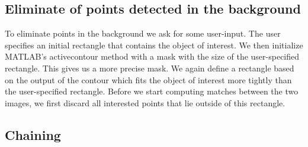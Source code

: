 \documentclass[12pt]{amsart}
\begin{document}
\subsection{Eliminate of points detected in the background}
\label{background}
To eliminate points in the background we ask for some user-input. The user specifies an initial rectangle that contains the object of interest. We then initialize MATLAB's activecontour method with a mask with the size of the user-specified rectangle. This gives us a more precise mask. We again define a rectangle based on the output of the contour which fits the object of interest more tightly than the user-specified rectangle. Before we start computing matches between the two images, we first discard all interested points that lie outside of this rectangle. 

\subsection{Chaining}
\end{document}

